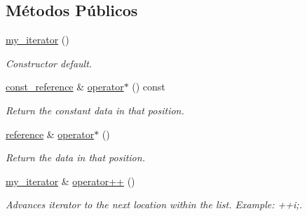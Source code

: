 \subsection*{Métodos Públicos}
\begin{DoxyCompactItemize}
\item 
\mbox{\label{classls_1_1my__iterator_ac18d9ac910a22e6b294edaecf86bfd19}} 
\hyperlink{classls_1_1my__iterator_ac18d9ac910a22e6b294edaecf86bfd19}{my\+\_\+iterator} ()
\begin{DoxyCompactList}\small\item\em Constructor default. \end{DoxyCompactList}\item 
\mbox{\label{classls_1_1my__iterator_ab8ae439a58cd299cbd364b3edf1dd855}} 
\hyperlink{classls_1_1my__const__iterator_a47552bc9ef18669651047b1741c7ed42}{const\+\_\+reference} \& \hyperlink{classls_1_1my__iterator_ab8ae439a58cd299cbd364b3edf1dd855}{operator$\ast$} () const
\begin{DoxyCompactList}\small\item\em Return the constant data in that position. \end{DoxyCompactList}\item 
\mbox{\label{classls_1_1my__iterator_a3eec7197d3d2b31cea843bc41b28451e}} 
\hyperlink{classls_1_1my__iterator_ad3b5d3648d5b83344888204a9e6d7bfa}{reference} \& \hyperlink{classls_1_1my__iterator_a3eec7197d3d2b31cea843bc41b28451e}{operator$\ast$} ()
\begin{DoxyCompactList}\small\item\em Return the data in that position. \end{DoxyCompactList}\item 
\mbox{\label{classls_1_1my__iterator_aa958375bc05acb1767e82e69373c9a25}} 
\hyperlink{classls_1_1my__iterator}{my\+\_\+iterator} \& \hyperlink{classls_1_1my__iterator_aa958375bc05acb1767e82e69373c9a25}{operator++} ()
\begin{DoxyCompactList}\small\item\em Advances iterator to the next location within the list. Example\+: ++i;. \end{DoxyCompactList}\item 
\mbox{\label{classls_1_1my__iterator_a87cd11c26f7cff8fb68631d100354143}} 

\end{DoxyCompactItemize}
